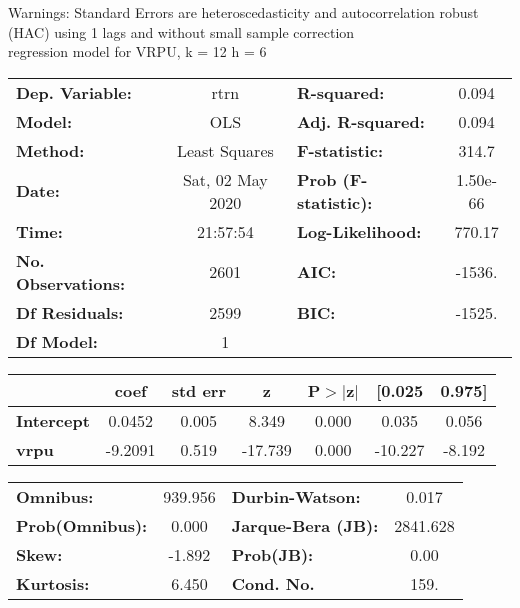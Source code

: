 Warnings: \newline
 [1] Standard Errors are heteroscedasticity and autocorrelation robust (HAC) using 1 lags and without small sample correction\\ 

regression model for VRPU, k = 12 h = 6\begin{center}
\begin{tabular}{lclc}
\toprule
\textbf{Dep. Variable:}    &       rtrn       & \textbf{  R-squared:         } &     0.094   \\
\textbf{Model:}            &       OLS        & \textbf{  Adj. R-squared:    } &     0.094   \\
\textbf{Method:}           &  Least Squares   & \textbf{  F-statistic:       } &     314.7   \\
\textbf{Date:}             & Sat, 02 May 2020 & \textbf{  Prob (F-statistic):} &  1.50e-66   \\
\textbf{Time:}             &     21:57:54     & \textbf{  Log-Likelihood:    } &    770.17   \\
\textbf{No. Observations:} &        2601      & \textbf{  AIC:               } &    -1536.   \\
\textbf{Df Residuals:}     &        2599      & \textbf{  BIC:               } &    -1525.   \\
\textbf{Df Model:}         &           1      & \textbf{                     } &             \\
\bottomrule
\end{tabular}
\begin{tabular}{lcccccc}
                   & \textbf{coef} & \textbf{std err} & \textbf{z} & \textbf{P$> |$z$|$} & \textbf{[0.025} & \textbf{0.975]}  \\
\midrule
\textbf{Intercept} &       0.0452  &        0.005     &     8.349  &         0.000        &        0.035    &        0.056     \\
\textbf{vrpu}      &      -9.2091  &        0.519     &   -17.739  &         0.000        &      -10.227    &       -8.192     \\
\bottomrule
\end{tabular}
\begin{tabular}{lclc}
\textbf{Omnibus:}       & 939.956 & \textbf{  Durbin-Watson:     } &    0.017  \\
\textbf{Prob(Omnibus):} &   0.000 & \textbf{  Jarque-Bera (JB):  } & 2841.628  \\
\textbf{Skew:}          &  -1.892 & \textbf{  Prob(JB):          } &     0.00  \\
\textbf{Kurtosis:}      &   6.450 & \textbf{  Cond. No.          } &     159.  \\
\bottomrule
\end{tabular}
\end{center}

